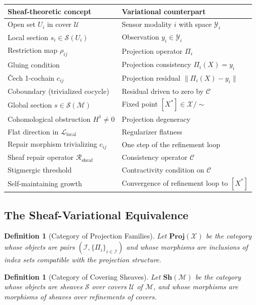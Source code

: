 \documentclass[11pt, oneside]{article}
\newtheorem{definition}[theorem]{Definition}
\newcommand{\Xmod}{\mathcal{X}/{\sim}}
\begin{document}
\begin{center}
\begin{tabular}{ll}
\toprule
\textbf{Sheaf-theoretic concept} & \textbf{Variational counterpart} \\
\midrule
Open set $U_i$ in cover $\mathcal{U}$ & Sensor modality $i$ with space $\mathcal{Y}_i$ \\
Local section $s_i \in \mathcal{S}(U_i)$ & Observation $y_i \in \mathcal{Y}_i$ \\
Restriction map $\rho_{ij}$ & Projection operator $\Pi_i$ \\
Gluing condition & Projection consistency $\Pi_i(X) = y_i$ \\
\v{C}ech 1-cochain $c_{ij}$ & Projection residual $\|\Pi_i(X) - y_i\|$ \\
Coboundary (trivialized cocycle) & Residual driven to zero by $\mathcal{C}$ \\
Global section $s \in \mathcal{S}(\mathcal{M})$ & Fixed point $[X^*] \in \Xmod$ \\
Cohomological obstruction $H^1 \ne 0$ & Projection degeneracy \\
Flat direction in $\mathcal{L}_{\mathrm{local}}$ & Regularizer flatness \\
Repair morphism trivializing $c_{ij}$ & One step of the refinement loop \\
Sheaf repair operator $\mathcal{R}_{\mathrm{sheaf}}$ & Consistency operator $\mathcal{C}$ \\
Stigmergic threshold & Contractivity condition on $\mathcal{C}$ \\
Self-maintaining growth & Convergence of refinement loop to $[X^*]$ \\
\bottomrule
\end{tabular}
\end{center}

\subsection{The Sheaf-Variational Equivalence}

\begin{definition}[Category of Projection Families]
Let $\mathbf{Proj}(\mathcal{X})$ be the category whose objects are pairs
$(\mathcal{I}, \{\Pi_i\}_{i \in \mathcal{I}})$ and whose morphisms are inclusions of
index sets compatible with the projection structure.
\end{definition}

\begin{definition}[Category of Covering Sheaves]
Let $\mathbf{Sh}(\mathcal{M})$ be the category whose objects are sheaves $\mathcal{S}$
over covers $\mathcal{U}$ of $\mathcal{M}$, and whose morphisms are morphisms of sheaves
over refinements of covers.
\end{definition}
\end{document}
